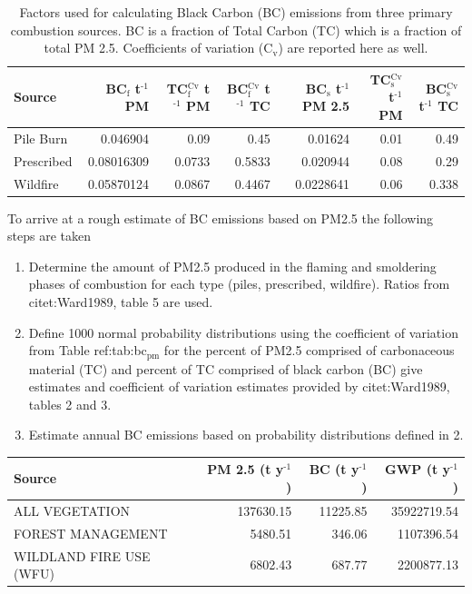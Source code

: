 \documentclass[a4paper]{article}
\begin{document}
\begin{table}[htb]
\caption{Factors used for calculating Black Carbon (BC) emissions from three primary combustion sources. BC is a fraction of Total Carbon (TC) which is a fraction of total PM 2.5. Coefficients of variation (C$_{\text{v}}$) are reported here as well.}
\centering
\begin{tabular}{lrrrrrr}
Source & BC$_{\text{f}}$ t$^{\text{-1}}$ PM & TC$_{\text{f}}^{\text{Cv}}$ t$^{\text{-1}}$ PM & BC$_{\text{f}}^{\text{Cv}}$ t$^{\text{-1}}$ TC & BC$_{\text{s}}$ t$^{\text{-1}}$ PM 2.5 & TC$_{\text{s}}^{\text{Cv}}$ t$^{\text{-1}}$ PM & BC$_{\text{s}}^{\text{Cv}}$ t$^{\text{-1}}$ TC\\
\hline
Pile Burn & 0.046904 & 0.09 & 0.45 & 0.01624 & 0.01 & 0.49\\
Prescribed & 0.08016309 & 0.0733 & 0.5833 & 0.020944 & 0.08 & 0.29\\
Wildfire & 0.05870124 & 0.0867 & 0.4467 & 0.0228641 & 0.06 & 0.338\\
\end{tabular}
\end{table}



To arrive at a rough estimate of BC emissions based on PM2.5 the
following steps are taken

\begin{enumerate}
\item Determine the amount of PM2.5 produced in the flaming and smoldering
phases of combustion for each type (piles, prescribed,
wildfire). Ratios from citet:Ward1989, table 5 are used.
\item Define 1000 normal probability distributions using the coefficient
of variation from Table ref:tab:bc$_{\text{pm}}$ for the percent of PM2.5
comprised of carbonaceous material (TC) and percent of TC comprised
of black carbon (BC) give estimates and coefficient of variation
estimates provided by citet:Ward1989, tables 2 and 3.
\item Estimate annual BC emissions based on probability distributions
defined in 2.
\end{enumerate}


\begin{center}
\begin{tabular}{lrrr}
Source & PM 2.5 (t y$^{\text{-1}}$) & BC (t y$^{\text{-1}}$) & GWP (t y$^{\text{-1}}$)\\
\hline
ALL VEGETATION & 137630.15 & 11225.85 & 35922719.54\\
FOREST MANAGEMENT & 5480.51 & 346.06 & 1107396.54\\
WILDLAND FIRE USE (WFU) & 6802.43 & 687.77 & 2200877.13\\
\end{tabular}
\end{center}
\end{document}
